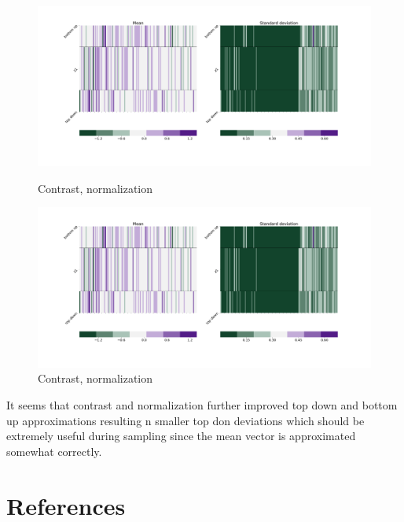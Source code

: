 \documentclass[12pt, english]{article}
\begin{document}
\begin{figure}[H]
  \begin{minipage}[b]{0.5\linewidth}
    \centering
    \includegraphics[width=.75\linewidth]{z1_vis/z1_vis_norm_contrast/16_DenseLinLinLadderVAE_textures_contrastNorm_contrast-stats-1_vector_comparisons_1.png}
    \caption{Contrast, normalization}
    \label{fig:sample-norm-contrast-1}
  \end{minipage}
  \begin{minipage}[b]{0.5\linewidth}
    \centering
    \includegraphics[width=.75\linewidth]{z1_vis/z1_vis_norm_contrast/16_DenseLinLinLadderVAE_textures_contrastNorm_contrast-stats-1_vector_comparisons_1.png}
    \caption{Contrast, normalization}
    \label{fig:sample-norm-contrast-2}
  \end{minipage}
\end{figure}

\vspace{4mm}

\par It seems that contrast and normalization further improved top down and bottom up approximations resulting n smaller top don deviations which should be extremely useful during sampling since the mean vector is approximated somewhat correctly.

\newpage

\section*{References}
\label{sec:references}
\printbibliography[heading=none]
\end{document}
